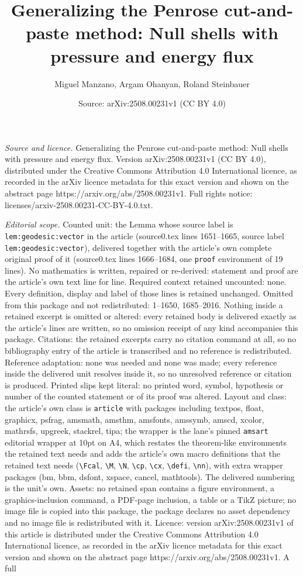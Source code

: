 \documentclass[10pt,a4paper]{amsart}
\title[Generalizing the Penrose cut-and-paste method: Null shells w]{Generalizing the Penrose cut-and-paste method: Null shells with pressure and energy flux}
\author{Miguel Manzano, Argam Ohanyan, Roland Steinbauer}
\date{Source: arXiv:2508.00231v1 (CC BY 4.0)}
\begin{document}
\maketitle

\noindent\emph{Source and licence.} Generalizing the Penrose cut-and-paste method: Null shells with pressure and energy flux. Version arXiv:2508.00231v1 (CC BY 4.0), distributed under the Creative Commons Attribution 4.0 International licence, as recorded in the arXiv licence metadata for this exact version and shown on the abstract page https://arxiv.org/abs/2508.00231v1. Full rights notice: licenses/arxiv-2508.00231-CC-BY-4.0.txt.\par\smallskip

\noindent\textit{Editorial scope.} Counted unit: the Lemma whose source label is \texttt{lem:geodesic:vector} in the article (source0.tex lines 1651--1665, source label \texttt{lem:geodesic:vector}), delivered together with the article's own complete original proof of it (source0.tex lines 1666--1684, one \texttt{proof} environment of 19 lines). No mathematics is written, repaired or re-derived: statement and proof are the article's own text line for line. Required context retained uncounted: none. Every definition, display and label of those lines is retained unchanged. Omitted from this package and not redistributed: 1--1650, 1685--2016. Nothing inside a retained excerpt is omitted or altered: every retained body is delivered exactly as the article's lines are written, so no omission receipt of any kind accompanies this package. Citations: the retained excerpts carry no citation command at all, so no bibliography entry of the article is transcribed and no reference is redistributed. Reference adaptation: none was needed and none was made; every reference inside the delivered unit resolves inside it, so no unresolved reference or citation is produced. Printed slips kept literal: no printed word, symbol, hypothesis or number of the counted statement or of its proof was altered. Layout and class: the article's own class is \texttt{article} with packages including textpos, float, graphicx, psfrag, amsmath, amsthm, amsfonts, amssymb, amscd, xcolor, mathrsfs, upgreek, stackrel, tipa; the wrapper is the lane's pinned \texttt{amsart} editorial wrapper at 10pt on A4, which restates the theorem-like environments the retained text needs and adds the article's own macro definitions that the retained text needs (\texttt{\textbackslash Fcal}, \texttt{\textbackslash M}, \texttt{\textbackslash N}, \texttt{\textbackslash cp}, \texttt{\textbackslash cx}, \texttt{\textbackslash defi}, \texttt{\textbackslash nn}), with extra wrapper packages (bm, bbm, dsfont, xspace, cancel, mathtools). The delivered numbering is the unit's own. Assets: no retained span contains a figure environment, a graphics-inclusion command, a PDF-page inclusion, a table or a TikZ picture; no image file is copied into this package, the package declares no asset dependency and no image file is redistributed with it. Licence: version arXiv:2508.00231v1 of this article is distributed under the Creative Commons Attribution 4.0 International licence, as recorded in the arXiv licence metadata for this exact version and shown on the abstract page https://arxiv.org/abs/2508.00231v1. A full 
\end{document}
